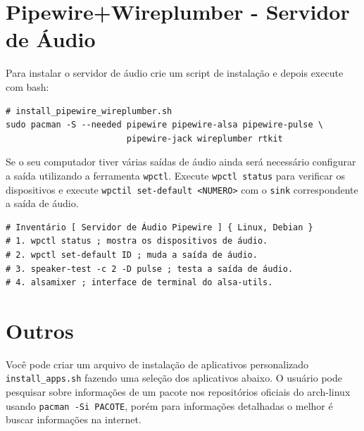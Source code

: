\documentclass[12pt,a4paper]{article}
\begin{document}
\section{Pipewire+Wireplumber - Servidor de Áudio}

\vspace{\baselineskip}

Para instalar o servidor de áudio crie um script de instalação e depois execute com bash:\\

\begin{lstlisting}
# install_pipewire_wireplumber.sh 
sudo pacman -S --needed pipewire pipewire-alsa pipewire-pulse \
                        pipewire-jack wireplumber rtkit
\end{lstlisting}

\vspace{\baselineskip}

Se o seu computador tiver várias saídas de áudio ainda será necessário configurar a saída utilizando a ferramenta \texttt{wpctl}. Execute \texttt{wpctl status} para verificar os dispositivos e execute \texttt{wpctil set-default <NUMERO>} com o \texttt{sink} correspondente a saída de áudio. \\

\begin{lstlisting}
# Inventário [ Servidor de Áudio Pipewire ] { Linux, Debian }
# 1. wpctl status ; mostra os dispositivos de áudio.
# 2. wpctl set-default ID ; muda a saída de áudio.
# 3. speaker-test -c 2 -D pulse ; testa a saída de áudio.
# 4. alsamixer ; interface de terminal do alsa-utils.
\end{lstlisting}

\section{Outros}

\hspace{\baselineskip}

Você pode criar um arquivo de instalação de aplicativos personalizado \texttt{install\_apps.sh} fazendo uma seleção dos aplicativos abaixo. O usuário pode pesquisar sobre informações de um pacote nos repositórios oficiais do arch-linux usando \texttt{pacman -Si PACOTE}, porém para informações detalhadas o melhor é buscar informações na internet. \\
\end{document}

